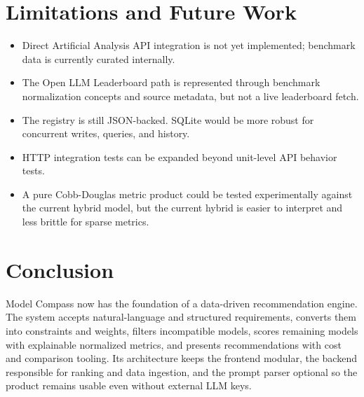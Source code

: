 \documentclass[11pt]{article}
\begin{document}
\section{Limitations and Future Work}

\begin{itemize}[leftmargin=*]
  \item Direct Artificial Analysis API integration is not yet implemented; benchmark data is currently curated internally.
  \item The Open LLM Leaderboard path is represented through benchmark normalization concepts and source metadata, but not a live leaderboard fetch.
  \item The registry is still JSON-backed. SQLite would be more robust for concurrent writes, queries, and history.
  \item HTTP integration tests can be expanded beyond unit-level API behavior tests.
  \item A pure Cobb-Douglas metric product could be tested experimentally against the current hybrid model, but the current hybrid is easier to interpret and less brittle for sparse metrics.
\end{itemize}

\section{Conclusion}

Model Compass now has the foundation of a data-driven recommendation engine. The system accepts natural-language and structured requirements, converts them into constraints and weights, filters incompatible models, scores remaining models with explainable normalized metrics, and presents recommendations with cost and comparison tooling. Its architecture keeps the frontend modular, the backend responsible for ranking and data ingestion, and the prompt parser optional so the product remains usable even without external LLM keys.
\end{document}
